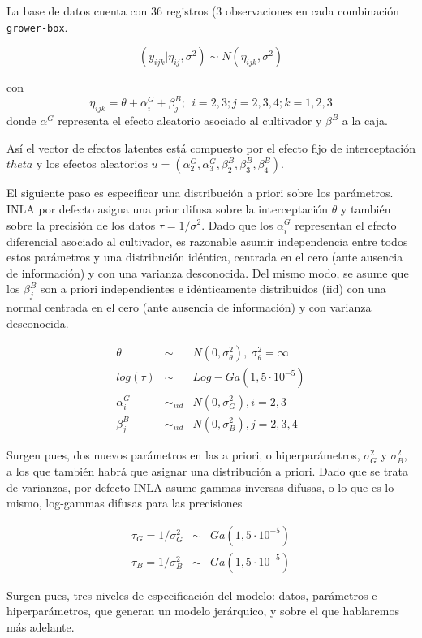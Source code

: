 \documentclass[
]{book}
\begin{document}
La base de datos cuenta con 36 registros (3 observaciones en cada combinación \texttt{grower-box}.

\[(y_{ijk}|\eta_{ij},\sigma^2 ) \sim N(\eta_{ijk},\sigma^2)\]

con \[\eta_{ijk} = \theta + \alpha_i^G + \beta_j^B; \ \  i=2,3; j=2,3,4; k=1,2,3\]
donde \(\alpha^G\) representa el efecto aleatorio asociado al cultivador y \(\beta^B\) a la caja.

Así el vector de efectos latentes está compuesto por el efecto fijo de interceptación \(theta\) y los efectos aleatorios \(u=(\alpha_2^G,\alpha_3^G,\beta_2^B,\beta_3^B,\beta_4^B)\).

El siguiente paso es especificar una distribución a priori sobre los parámetros. INLA por defecto asigna una prior difusa sobre la interceptación \(\theta\) y también sobre la precisión de los datos \(\tau=1/\sigma^2\). Dado que los \(\alpha_i^G\) representan el efecto diferencial asociado al cultivador, es razonable asumir independencia entre todos estos parámetros y una distribución idéntica, centrada en el cero (ante ausencia de información) y con una varianza desconocida. Del mismo modo, se asume que los \(\beta_j^B\) son a priori independientes e idénticamente distribuidos (iid) con una normal centrada en el cero (ante ausencia de información) y con varianza desconocida.

\begin{eqnarray*}
\theta &\sim & N(0,\sigma_{\theta}^2), \ \sigma_{\theta}^2=\infty \\
log(\tau) &\sim & Log-Ga(1,5\cdot 10^{-5})\\
\alpha_i^G & \sim_{iid} & N(0,\sigma_{G}^2), i=2,3 \\
\beta_j^B & \sim_{iid} & N(0,\sigma_{B}^2), j=2,3,4
\end{eqnarray*}

Surgen pues, dos nuevos parámetros en las a priori, o hiperparámetros, \(\sigma_{G}^2\) y \(\sigma_{B}^2\), a los que también habrá que asignar una distribución a priori. Dado que se trata de varianzas, por defecto INLA asume gammas inversas difusas, o lo que es lo mismo, log-gammas difusas para las precisiones

\begin{eqnarray*}
\tau_{G}=1/\sigma_{G}^2 &\sim & Ga(1,5\cdot 10^{-5}) \\
\tau_{B}=1/\sigma_{B}^2 &\sim & Ga(1,5\cdot 10^{-5})
\end{eqnarray*}

Surgen pues, tres niveles de especificación del modelo: datos, parámetros e hiperparámetros, que generan un modelo jerárquico, y sobre el que hablaremos más adelante.
\end{document}
